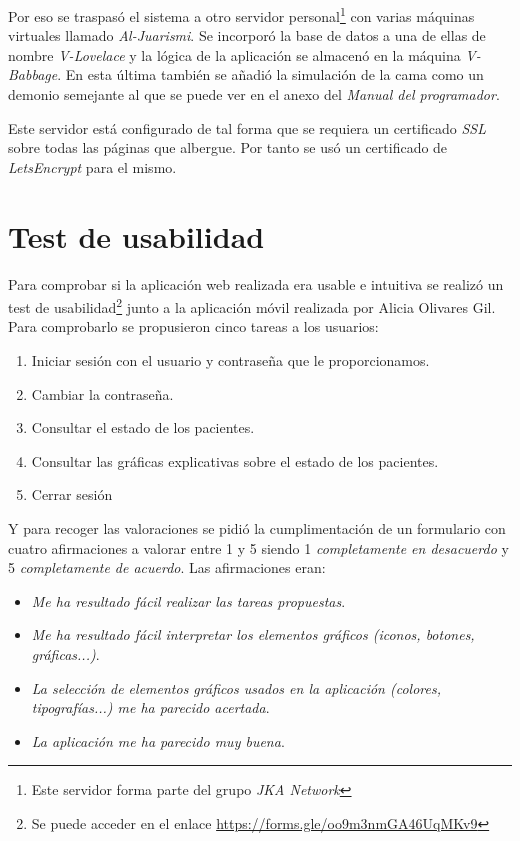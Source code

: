 Por eso se traspasó el sistema a otro servidor personal\footnote{Este servidor forma parte del grupo \textit{JKA Network}} con varias máquinas virtuales llamado \textit{Al-Juarismi}. Se incorporó la base de datos a una de ellas de nombre \textit{V-Lovelace} y la lógica de la aplicación se almacenó en la máquina \textit{V-Babbage}. En esta última también se añadió la simulación de la cama como un demonio semejante al que se puede ver en el anexo del \textit{Manual del programador}.

Este servidor está configurado de tal forma que se requiera un certificado \textit{SSL} sobre todas las páginas que albergue. Por tanto se usó un certificado de \textit{LetsEncrypt} para el mismo.

\section{Test de usabilidad}

Para comprobar si la aplicación web realizada era usable e intuitiva se realizó un test de usabilidad\footnote{Se puede acceder en el enlace \url{https://forms.gle/oo9m3nmGA46UqMKv9}} junto a la aplicación móvil realizada por Alicia Olivares Gil. Para comprobarlo se propusieron cinco tareas a los usuarios:

\begin{enumerate}\small
	\item Iniciar sesión con el usuario y contraseña que le proporcionamos. 
	\item Cambiar la contraseña. 
	\item Consultar el estado de los pacientes. 
	\item Consultar las gráficas explicativas sobre el estado de los pacientes. 
	\item Cerrar sesión	
\end{enumerate}

Y para recoger las valoraciones se pidió la cumplimentación de un formulario con cuatro afirmaciones a valorar entre 1 y 5 siendo 1 \textit{completamente en desacuerdo} y 5 \textit{completamente de acuerdo}. Las afirmaciones eran:
\begin{itemize}\small
	\item \textit{Me ha resultado fácil realizar las tareas propuestas}.
	\item \textit{Me ha resultado fácil interpretar los elementos gráficos (iconos, botones, gráficas...)}.
	\item \textit{La selección de elementos gráficos usados en la aplicación (colores, tipografías...) me ha parecido acertada}.
	\item \textit{La aplicación me ha parecido muy buena}.
\end{itemize}


